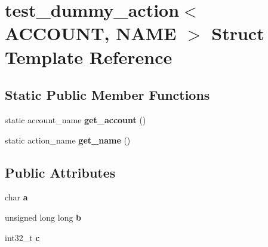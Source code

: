 \hypertarget{structtest__dummy__action}{}\section{test\+\_\+dummy\+\_\+action$<$ A\+C\+C\+O\+U\+NT, N\+A\+ME $>$ Struct Template Reference}
\label{structtest__dummy__action}
\subsection*{Static Public Member Functions}
\begin{DoxyCompactItemize}
\item 
\mbox{\label{structtest__dummy__action_a02331902dae61c7bda707ad291a8967f}} 
static account\+\_\+name {\bfseries get\+\_\+account} ()
\item 
\mbox{\label{structtest__dummy__action_acc1ad8fa9abee64ae64bd90f8fb7cfb4}} 
static action\+\_\+name {\bfseries get\+\_\+name} ()
\end{DoxyCompactItemize}
\subsection*{Public Attributes}
\begin{DoxyCompactItemize}
\item 
\mbox{\label{structtest__dummy__action_ad609955f337bd7fd333197f8cb08b31e}} 
char {\bfseries a}
\item 
\mbox{\label{structtest__dummy__action_a375c231720a8e7541acafcafafd4329b}} 
unsigned long long {\bfseries b}
\item 
\mbox{\label{structtest__dummy__action_af15ed93599050cd4f0406d00bb6ee694}} 
int32\+\_\+t {\bfseries c}
\end{DoxyCompactItemize}
